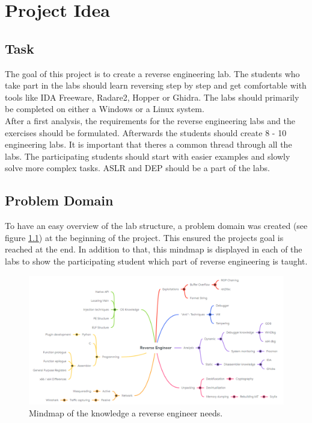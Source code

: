 \chapter{Project Idea}
\section{Task}
\label{sec:task}
The goal of this project is to create a reverse engineering lab. The students who take part in the labs should learn reversing step by step and get comfortable with tools like IDA Freeware, Radare2, Hopper or Ghidra. The labs should primarily be completed on either a Windows or a Linux system. \\
After a first analysis, the requirements for the reverse engineering labs and the exercises should be formulated. Afterwards the students should create 8 - 10 engineering labs. It is important that theres a common thread through all the labs. The participating students should start with easier examples and slowly solve more complex tasks. ASLR and DEP should be a part of the labs.

\section{Problem Domain}
To have an easy overview of the lab structure, a problem domain was created (see figure \ref{fig:mindmap}) at the beginning of the project. This ensured the projects goal is reached at the end. In addition to that, this mindmap is displayed in each of the labs to show the participating student which part of reverse engineering is taught.
\begin{figure}[H]
    \includegraphics[width=\linewidth, center]{resources/RE_Domain_Light.png}
    \caption{Mindmap of the knowledge a reverse engineer needs.}
    \label{fig:mindmap}
\end{figure}

